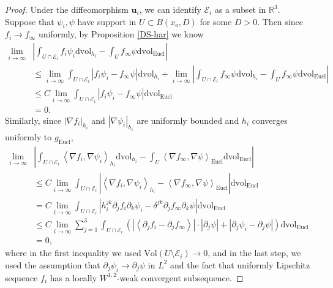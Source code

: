 \documentclass[letter]{amsart}
\theoremstyle{definition}
\theoremstyle{remark}
\def\Vol{\mathrm{Vol}}
\begin{document}
\begin{proof}
	Under the diffeomorphism $\mathbf{u}_i$, we can identify $\mathcal{E}_i$ as a subset in $\mathbb{R}^3$. Suppose that $\psi _i, \psi $ have support in $U \subset B(x_o,D)$ for some $D>0$. Then since $f _i \to f _\infty$ uniformly, by Proposition \ref{DS-har} we know
	\begin{align*}
		\lim_{i\to \infty} & \left| \int_{U \cap \mathcal{E}_i} f _i \psi _i \mathrm{dvol}_{h_i} - \int_{U} f _\infty \psi \mathrm{dvol}_{\mathrm{Eucl}} \right| \\
		& \leq \lim_{i\to \infty}  \int_{U \cap \mathcal{E}_i} |f _i \psi _i - f _\infty \psi | \mathrm{dvol}_{h_i} + \lim_{i\to \infty} \left| \int_{U\cap \mathcal{E}_i} f _\infty \psi \mathrm{dvol}_{h_i} - \int_{U} f _\infty \psi \mathrm{dvol}_{\mathrm{Eucl}} \right| \\
		& \leq C \lim_{i\to \infty} \int_{U \cap \mathcal{E}_i}|f _i \psi _i - f _\infty \psi | \mathrm{dvol}_{\mathrm{Eucl}}\\
		&=0.
	\end{align*}
	Similarly, since $|\nabla f _i|_{h_i}$ and $|\nabla \psi _i|_{h_i}$ are uniformly bounded and $h_i$ converges uniformly to $g_{\mathrm{Eucl}} $,
	\begin{align*}
		\lim_{i\to \infty} & \left| \int_{U \cap \mathcal{E}_i} \left< \nabla f _i, \nabla  \psi _i\right>_{h_i} \mathrm{dvol}_{h_i} - \int_{U} \left< \nabla f _\infty, \nabla  \psi\right>_{\mathrm{Eucl} } \mathrm{dvol}_{\mathrm{Eucl}} \right| \\
		& \leq C \lim_{i\to \infty} \int_{U \cap \mathcal{E}_i}\left| \left<\nabla f_i, \nabla \psi _i \right>_{h_i} - \left<\nabla f _\infty, \nabla \psi  \right>_{\mathrm{Eucl} } \right| \mathrm{dvol}_{\mathrm{Eucl}} \\
		&= C \lim_{i\to \infty} \int_{U \cap \mathcal{E}_i} \left|h_i^{jk} \partial _j f _i \partial _k \psi_i - \delta ^{jk} \partial _j f _\infty \partial _k \psi \right| \mathrm{dvol}_{\mathrm{Eucl}}\\
		&\leq C \lim_{i\to \infty} \sum_{j=1}^{3} \int_{U \cap \mathcal{E}_i}\left( |\left<\partial _j f _i - \partial _j f _\infty \right>|\cdot |\partial _j \psi | + | \partial _j \psi _i - \partial _j \psi |\right) \mathrm{dvol}_{\mathrm{Eucl}}  \\
		&=0,	
	\end{align*}
	where in the first inequality we used $\Vol(U \setminus \mathcal{E}_i) \to 0$, and in the last step, we used the assumption that $\partial _j \psi _i \to \partial _j \psi $ in $L^2$ and the fact that uniformly Lipschitz sequence $f _i$ has a locally $W^{1,2}$-weak convergent subsequence.
\end{proof}
\end{document}
